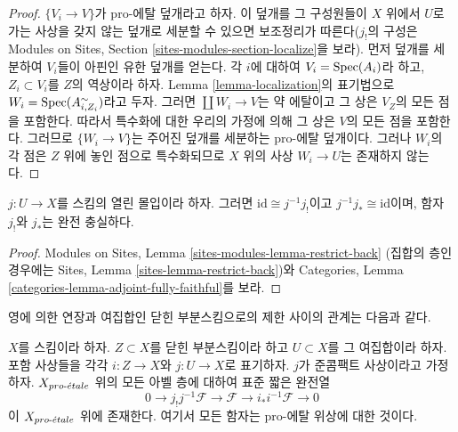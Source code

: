 \begin{proof}
$\{V_i \to V\}$가 pro-에탈 덮개라고 하자. 이 덮개를 그 구성원들이
$X$ 위에서 $U$로 가는 사상을 갖지 않는 덮개로 세분할 수 있으면
보조정리가 따른다($j_!$의 구성은 Modules on Sites, Section
\ref{sites-modules-section-localize}을 보라). 먼저 덮개를 세분하여
$V_i$들이 아핀인 유한 덮개를 얻는다. 각 $i$에 대하여
$V_i = \mathop{\mathrm{Spec}}(A_i)$라 하고, $Z_i \subset V_i$를 $Z$의 역상이라 하자.
Lemma \ref{lemma-localization}의 표기법으로
$W_i = \mathop{\mathrm{Spec}}(A_{i, Z_i}^\sim)$라고 두자. 그러면
$\coprod W_i \to V$는 약 에탈이고 그 상은 $V_Z$의 모든 점을
포함한다. 따라서 특수화에 대한 우리의 가정에 의해 그 상은 $V$의
모든 점을 포함한다. 그러므로 $\{W_i \to V\}$는 주어진 덮개를
세분하는 pro-에탈 덮개이다. 그러나 $W_i$의 각 점은 $Z$ 위에 놓인
점으로 특수화되므로 $X$ 위의 사상 $W_i \to U$는 존재하지 않는다.
\end{proof}

\begin{lemma}
\label{lemma-open-immersion}
$j : U \to X$를 스킴의 열린 몰입이라 하자. 그러면
$\text{id} \cong j^{-1}j_!$이고 $j^{-1}j_* \cong \text{id}$이며,
함자 $j_!$와 $j_*$는 완전 충실하다.
\end{lemma}

\begin{proof}
Modules on Sites, Lemma \ref{sites-modules-lemma-restrict-back}
(집합의 층인 경우에는 Sites, Lemma
\ref{sites-lemma-restrict-back})와 Categories, Lemma
\ref{categories-lemma-adjoint-fully-faithful}를 보라.
\end{proof}

\noindent
영에 의한 연장과 여집합인 닫힌 부분스킴으로의 제한 사이의 관계는
다음과 같다.

\begin{lemma}
\label{lemma-ses-associated-to-open}
$X$를 스킴이라 하자. $Z \subset X$를 닫힌 부분스킴이라 하고
$U \subset X$를 그 여집합이라 하자. 포함 사상들을 각각
$i : Z \to X$와 $j : U \to X$로 표기하자. $j$가 준콤팩트 사상이라고
가정하자. $X_{pro\text{-}\acute{e}tale}$ 위의 모든 아벨 층에 대하여 표준 짧은 완전열
$$
0 \to j_!j^{-1}\mathcal{F} \to \mathcal{F} \to i_*i^{-1}\mathcal{F} \to 0
$$
이 $X_{pro\text{-}\acute{e}tale}$ 위에 존재한다. 여기서 모든 함자는 pro-에탈 위상에
대한 것이다.
\end{lemma}

